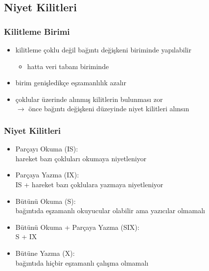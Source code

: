 \documentclass[dvipsnames]{beamer}
\theoremstyle{definition}
\theoremstyle{example}
\theoremstyle{plain}
\begin{document}
\subsection{Niyet Kilitleri}

\begin{frame}
  \frametitle{Kilitleme Birimi}

  \begin{itemize}
    \item kilitleme çoklu değil bağıntı değişkeni biriminde yapılabilir
    \begin{itemize}
      \item hatta veri tabanı biriminde
    \end{itemize}

    \item birim genişledikçe eşzamanlılık azalır

    \pause
    \item çoklular üzerinde alınmış kilitlerin bulunması zor\\
      $\rightarrow$ önce bağıntı değişkeni düzeyinde \alert{niyet kilitleri}
      alınsın
  \end{itemize}
\end{frame}

\begin{frame}
  \frametitle{Niyet Kilitleri}

  \begin{itemize}
    \item Parçayı Okuma (IS):\\
      hareket bazı çokluları okumaya niyetleniyor

    \pause
    \item Parçaya Yazma (IX):\\
      IS + hareket bazı çoklulara yazmaya niyetleniyor

    \pause
    \item Bütünü Okuma (S):\\
      bağıntıda eşzamanlı okuyucular olabilir ama yazıcılar olmamalı

    \pause
    \item Bütünü Okuma + Parçaya Yazma (SIX):\\
      S + IX

    \pause
    \item Bütüne Yazma (X):\\
      bağıntıda hiçbir eşzamanlı çalışma olmamalı
  \end{itemize}
\end{frame}
\end{document}
